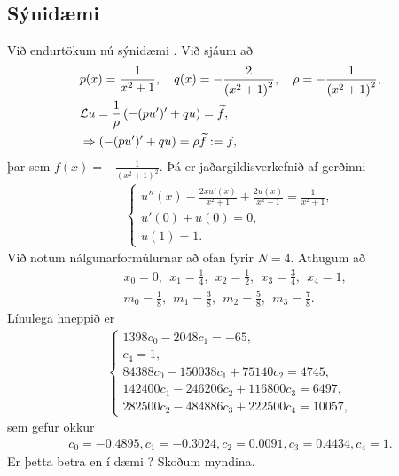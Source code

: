 \documentclass[a4paper,10pt,icelandic]{sphinxmanual}
\begin{document}
\subsection{Sýnidæmi}
\label{\detokenize{Kafli05:id1}}\label{\detokenize{Kafli05:example-5-2-1}}
Við endurtökum nú sýnidæmi {\hyperref[\detokenize{Kafli05:example-5-1-1}]{}}.
Við sjáum að
\begin{equation*}
\begin{split}& p(x)=\frac{1}{x^2+1}, \quad q(x)=-\frac{2}{\left(x^2+1\right)^2},\quad \rho=-\frac{1}{\left(x^2+1\right)^2}, \\
& \mathcal L u = {1\over \rho} \left( -(p u^\prime)^\prime +q u\right) = \widetilde{f}, \\
& \Rightarrow \left( -(p u^\prime)^\prime +q u\right) = \rho \widetilde{f} := f,\end{split}
\end{equation*}
þar sem \(f(x)= -\frac{1}{\left(x^2+1\right)^2}\).
Þá er jaðargildisverkefnið af gerðinni
\begin{equation*}
\begin{split}\begin{cases}
u''(x)-\frac{2 x u'(x)}{x^2+1}+\frac{2 u(x)}{x^2+1}=\frac{1}{x^2+1},\\
u'(0)+u(0)=0,\\
u(1)=1.
\end{cases}\end{split}
\end{equation*}
Við notum nálgunarformúlurnar að ofan fyrir \(N=4\).
Athugum að
\begin{equation*}
\begin{split}& x_0= 0, ~~ x_1= \frac{1}{4}, ~~ x_2=\frac{1}{2}, ~~ x_3=\frac{3}{4}, ~~ x_4=1,\\
& m_0=\frac{1}{8}, ~~ m_1=\frac{3}{8}, ~~ m_2=\frac{5}{8}, ~~ m_3=\frac{7}{8}.\end{split}
\end{equation*}
Línulega hneppið er
\begin{equation*}
\begin{split}\begin{cases}
1398 c_0-2048 c_1=-65, \\
c_4=1, \\
84388 c_0-150038 c_1+75140 c_2=4745,\\
142400 c_1-246206 c_2+116800 c_3=6497,
\\
282500 c_2-484886 c_3+222500 c_4 =10057,
\end{cases}\end{split}
\end{equation*}
sem gefur okkur
\begin{equation*}
\begin{split}c_0= -0.4895, c_1=-0.3024, c_2= 0.0091,
c_3= 0.4434, c_4= 1.\end{split}
\end{equation*}
Er þetta betra en í dæmi {\hyperref[\detokenize{Kafli05:example-5-1-1}]{}}? Skoðum myndina.
\end{document}
